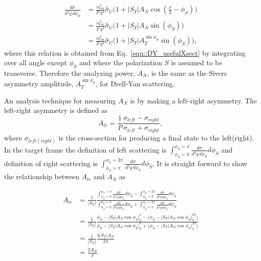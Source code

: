 \begin{align}
  \frac{d\sigma}{d^4 q \, d \phi_S} &= \frac{\alpha_{em}^2}{F \,
    q^2}\hat{\sigma}_U\Big(1+|S_T|A_N \cos (\frac{\pi}{2} - \phi_S) \Big)
  \\ \nonumber
  &= \frac{\alpha_{em}^2}{F \,
    q^2}\hat{\sigma}_U\Big(1+|S_T|A_N \sin(\phi_S) \Big)
  \\ \nonumber
  &= \frac{\alpha_{em}^2}{F \,
    q^2}\hat{\sigma}_U \Big(1+|S_T| A_{T}^{\sin \phi_S} \sin(\phi_S)\Big),
\end{align}
\noindent
where this relation is obtained from Eq.~\ref{equ::DY_usefulXsect} by
integrating over all angle except $\phi_S$ and where the polarization $S$ is
assumed to be transverse.  Therefore the analyzing power, $A_N$, is the same as
the Sivers asymmetry amplitude, $A_{T}^{\sin \phi_S}$, for Drell-Yan scattering.

An analysis technique for measuring $A_N$ is by making a left-right asymmetry.
The left-right asymmetry is defined as 
\begin{equation}
  A_{lr} = \frac{1}{P}\frac{\sigma_{left} -
    \sigma_{right}}{\sigma_{left} + \sigma_{right}},
\end{equation}
\noindent
where $\sigma_{left(right)}$ is the cross-section for producing a final state to
the left(right).  In the target frame the definition of left scattering is
$\int_{\phi_S=0}^{\phi_S=\pi}\frac{d\sigma}{d^4 q \, d \phi_S} d\phi_S$ and
definition of right scattering is
$\int_{\phi_S=\pi}^{\phi_S=2\pi}\frac{d\sigma}{d^4 q \, d \phi_S} d\phi_S$.  It
is straight forward to show the relationship between $A_{lr}$ and $A_N$ as

\begin{align}
  A_{lr} &= \frac{1}{|S_T|}
  \frac{\int_{\phi_S=0}^{\phi_S=\pi} \frac{d\sigma}{d^4 q \, d \phi_S}d\phi_S
    - \int_{\phi_S=\pi}^{\phi_S=2\pi}\frac{d\sigma}{d^4 q \, d \phi_S}d\phi_S}
       {\int_{\phi_S=0}^{\phi_S=\pi}\frac{d\sigma}{d^4 q \, d \phi_S}d\phi_S
         + \int_{\phi_S=\pi}^{\phi_S=2\pi}\frac{d\sigma}{d^4 q \, d \phi_S}d\phi_S}
       \\ \nonumber
       &= \frac{1}{|S_T|}
       \frac{\phi_S -|S_T|A_N\cos\phi_S \Big|_0^{\pi}
       - \Big(\phi_S -|S_T|A_N\cos\phi_S \Big|_{\pi}^{2\pi}\Big)}
            {\phi_S -|S_T|A_N\cos\phi_S \Big|_0^{\pi}
              + \Big(\phi_S -|S_T|A_N\cos\phi_S \Big|_{\pi}^{2\pi}\Big)}
            \\ \nonumber
            &= \frac{1}{|S_T|}
            \frac{4|S_T|A_N}{2\pi}
            \\ \nonumber
            &= \frac{2A_N}{\pi}.
\end{align}

